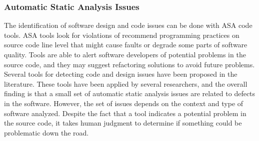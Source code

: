 

\subsubsection{Automatic Static Analysis Issues}
The identification of software design and code issues can be done with ASA code tools. ASA tools look for violations of recommend programming practices on source code line level that might cause faults or degrade some parts of software quality\cite{zazworka2014comparing}. Tools are able to alert software developers of potential problems in the source code, and they may suggest refactoring solutions to avoid future problems. Several tools for detecting code and design issues have been proposed in the literature\cite{rutar2004comparison}. These tools have been applied by several researchers\cite{zazworka2014comparing,copeland2005pmd,codabux2016technical,rutar2004comparison}, and the overall finding is that a small set of automatic static analysis issues are related to defects in the software. However, the set of issues depends on the context and type of software analyzed. Despite the fact that a tool indicates a potential problem in the source code, it takes human judgment to determine if something could be problematic down the road. 



